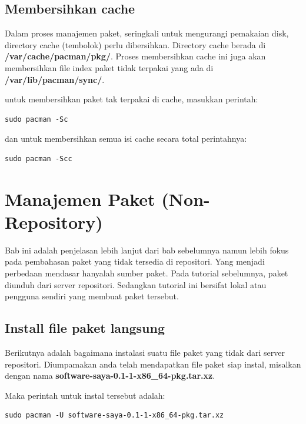 \documentclass[12pt,]{article}
\begin{document}
	\subsection{Membersihkan cache}
	
	Dalam proses manajemen paket, seringkali untuk mengurangi pemakaian disk,
	directory cache (tembolok) perlu dibersihkan.
	Directory cache berada di \textbf{/var/cache/pacman/pkg/}.
	Proses membersihkan cache ini juga akan membersihkan file index paket tidak terpakai 
	yang ada di \textbf{/var/lib/pacman/sync/}.
	
	untuk membersihkan paket tak terpakai di cache, masukkan perintah:
	
	\begin{verbatim}
sudo pacman -Sc
	\end{verbatim}
	
	dan untuk membersihkan semua isi cache secara total perintahnya:
	
	\begin{verbatim}
sudo pacman -Scc
	\end{verbatim}
		 
	\newpage
	\section{Manajemen Paket (Non-Repository)}
	
	Bab ini adalah penjelasan lebih lanjut dari bab sebelumnya namun lebih fokus pada pembahasan paket yang tidak tersedia di repositori.
	Yang menjadi perbedaan mendasar hanyalah sumber paket. 
	Pada tutorial sebelumnya, paket diunduh dari server repositori.
	Sedangkan tutorial ini bersifat lokal atau pengguna sendiri yang membuat paket tersebut.
	
	\subsection{Install file paket langsung}
	Berikutnya adalah bagaimana instalasi suatu file paket yang tidak dari server repositori.
	Diumpamakan anda telah mendapatkan file paket siap instal, misalkan dengan nama \textbf{software-saya-0.1-1-x86\_64-pkg.tar.xz}.
	
	Maka perintah untuk instal tersebut adalah:
	\begin{verbatim}
sudo pacman -U software-saya-0.1-1-x86_64-pkg.tar.xz
	\end{verbatim}
	
\end{document}
